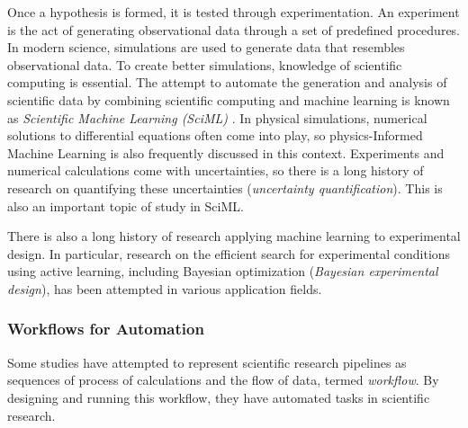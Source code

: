 Once a hypothesis is formed, it is tested through experimentation. An experiment is the act of generating observational data through a set of predefined procedures. In modern science, simulations are used to generate data that resembles observational data. To create better simulations, knowledge of scientific computing is essential. The attempt to automate the generation and analysis of scientific data by combining scientific computing and machine learning is known as \textit{Scientific Machine Learning (SciML)} \cite{baker2019basic}. In physical simulations, numerical solutions to differential equations often come into play, so physics-Informed Machine Learning is also frequently discussed in this context. Experiments and numerical calculations come with uncertainties, so there is a long history of research on quantifying these uncertainties (\textit{uncertainty quantification}). This is also an important topic of study in SciML.

There is also a long history of research applying machine learning to experimental design. In particular, research on the efficient search for experimental conditions using active learning, including Bayesian optimization (\textit{Bayesian experimental design}), has been attempted in various application fields.




\subsubsection{Workflows for Automation}
Some studies have attempted to represent scientific research pipelines as sequences of process of calculations and the flow of data, termed \textit{workflow}. By designing and running this workflow, they have automated tasks in scientific research. 


